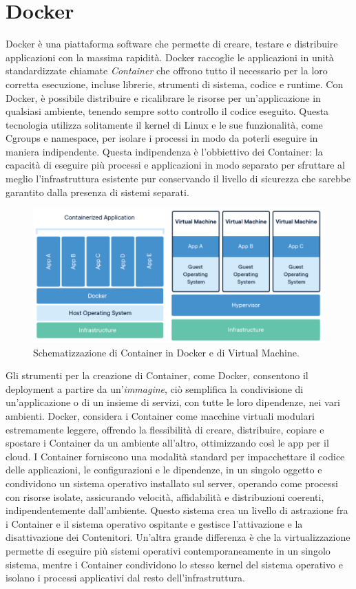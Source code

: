 \section{Docker}
Docker è una piattaforma software che permette di creare, testare e distribuire applicazioni con la massima rapidità. Docker raccoglie 
le applicazioni in unità standardizzate chiamate \textit{Container} che offrono tutto il necessario per la loro corretta esecuzione, incluse librerie, 
strumenti di sistema, codice e runtime. Con Docker, è possibile distribuire e ricalibrare le risorse per un'applicazione in qualsiasi ambiente, 
tenendo sempre sotto controllo il codice eseguito.\hfill\break
Questa tecnologia utilizza solitamente il kernel di Linux e le sue funzionalità, come Cgroups e namespace, per isolare i processi in modo da poterli 
eseguire in maniera indipendente. Questa indipendenza è l'obbiettivo dei Container: la capacità di eseguire più processi e applicazioni in 
modo separato per sfruttare al meglio l'infrastruttura esistente pur conservando il livello di sicurezza che sarebbe garantito dalla 
presenza di sistemi separati.
%
\begin{figure}[ht!]
    \centering
    \includegraphics[scale=0.5]{images/Docker_Config_Container.png}
    \caption{Schematizzazione di Container in Docker e di Virtual Machine.}
    \label{fig:DCC}
\end{figure}
\hfill\break
Gli strumenti per la creazione di Container, come Docker, consentono il deployment a partire da un'\textit{immagine}, ciò semplifica la condivisione di 
un'applicazione o di un insieme di servizi, con tutte le loro dipendenze, nei vari ambienti.
Docker, considera i Container come macchine virtuali modulari estremamente leggere, offrendo la flessibilità di creare, distribuire, 
copiare e spostare i Container da un ambiente all'altro, ottimizzando così le app per il cloud.\hfill\break
I Container forniscono una modalità standard per impacchettare il codice delle applicazioni, le configurazioni e le dipendenze, in un singolo oggetto e 
condividono un sistema operativo installato sul server, operando come processi con risorse isolate, assicurando velocità, affidabilità e distribuzioni coerenti, 
indipendentemente dall’ambiente.\hfill\break
%
Questo sistema crea un livello di astrazione fra i Container e il sistema operativo ospitante e gestisce l’attivazione e la disattivazione dei Contenitori. 
Un'altra grande differenza è che la virtualizzazione permette di eseguire più sistemi operativi contemporaneamente in un singolo sistema, mentre i Container 
condividono lo stesso kernel del sistema operativo e isolano i processi applicativi dal resto dell’infrastruttura.
%
